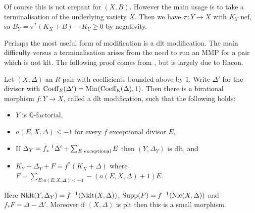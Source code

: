 %	
%	

\begin{remark}
	Of course this is not crepant for $(X,B)$. However the main usage is to take a terminalisation of the underlying variety $X$. Then we have $\pi \colon Y \to X$ with $K_{Y}$ nef, so $B_{Y}=\pi^{*}(K_{X}+B)-K_{Y} \geq 0$ by negativity. 
	
\end{remark}


Perhaps the most useful form of modification is a dlt modification. The main difficulty versus a terminalisation arises from the need to run an MMP for a pair which is not klt. The following proof comes from \cite[Theorem 10.4]{fujino2009fundamental}, but is largely due to Hacon.

\begin{theorem}\label{dlt-mod}
	Let $(X,\Delta)$ an $R$ pair with coefficients bounded above by $1$. Write $\Delta'$ for the divisor with $\textup{Coeff}_{E}(\Delta')=\textup{Min}(\textup{Coeff}_{E}(\Delta),1)$. Then there is a birational morphism $f\colon Y \to X$, called a dlt modification, such that the following holds:
	\begin{itemize}
		\item $Y$ is $\mathbb{Q}$-factorial,
		\item $a(E,X,\Delta) \leq -1$ for every $f$ exceptional divisor $E$,
		\item If $\Delta_{Y}=f^{-1}_{*}\Delta' + \sum_{E \textup{ exceptional}} E$ then $(Y,\Delta_{Y})$ is dlt, and
		\item $K_{Y}+\Delta_{Y}+F=f^{*}(K_{X}+\Delta)$ where $F= \sum_{E\colon a(E,X,\Delta)<-1} -(a(E,X,\Delta)+1)E$.
	\end{itemize}
	Here $\textup{Nklt}(Y,\Delta_{Y})=f^{-1}(\textup{Nklt}(X,\Delta))$, $\text{Supp}(F)=f^{-1}(\textup{Nlc}(X,\Delta))$ and $f_{*}F=\Delta-\Delta'$. Moreover if $(X,\Delta)$ is plt then this is a small morphism.
\end{theorem}

